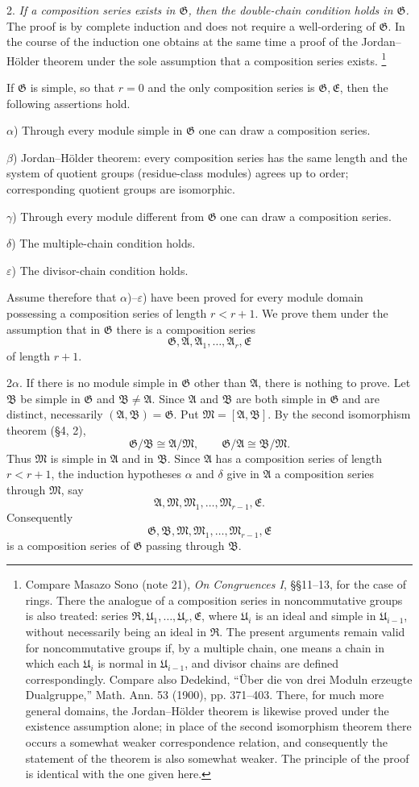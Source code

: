 \documentclass[11pt]{article}
\providecommand{\mR}{\mathfrak{R}}
\providecommand{\mM}{\mathfrak{M}}
\providecommand{\mA}{\mathfrak{A}}
\providecommand{\mB}{\mathfrak{B}}
\providecommand{\mE}{\mathfrak{E}}
\providecommand{\mG}{\mathfrak{G}}
\providecommand{\mU}{\mathfrak{U}}
\begin{document}
2. \emph{If a composition series exists in $\mG$, then the double-chain condition holds in $\mG$.} The proof is by complete induction and does not require a well-ordering of $\mG$. In the course of the induction one obtains at the same time a proof of the Jordan--Hölder theorem under the sole assumption that a composition series exists.
\footnote{Compare Masazo Sono (note 21), \emph{On Congruences I}, §§11--13, for the case of rings. There the analogue of a composition series in noncommutative groups is also treated: series $\mR,\mU_1,\ldots,\mU_r,\mE$, where $\mU_i$ is an ideal and simple in $\mU_{i-1}$, without necessarily being an ideal in $\mR$. The present arguments remain valid for noncommutative groups if, by a multiple chain, one means a chain in which each $\mU_i$ is normal in $\mU_{i-1}$, and divisor chains are defined correspondingly. Compare also Dedekind, ``Über die von drei Moduln erzeugte Dualgruppe,'' Math. Ann. 53 (1900), pp. 371--403. There, for much more general domains, the Jordan--Hölder theorem is likewise proved under the existence assumption alone; in place of the second isomorphism theorem there occurs a somewhat weaker correspondence relation, and consequently the statement of the theorem is also somewhat weaker. The principle of the proof is identical with the one given here.}

If $\mG$ is simple, so that $r=0$ and the only composition series is $\mG,\mE$, then the following assertions hold.

$\alpha$) Through every module simple in $\mG$ one can draw a composition series.

$\beta$) Jordan--Hölder theorem: every composition series has the same length and the system of quotient groups (residue-class modules) agrees up to order; corresponding quotient groups are isomorphic.

$\gamma$) Through every module different from $\mG$ one can draw a composition series.

$\delta$) The multiple-chain condition holds.

$\varepsilon$) The divisor-chain condition holds.

Assume therefore that $\alpha$)--$\varepsilon$) have been proved for every module domain possessing a composition series of length $r<r+1$. We prove them under the assumption that in $\mG$ there is a composition series
\[
        \mG,\mA,\mA_1,\ldots,\mA_r,\mE
\]
of length $r+1$.

2$\alpha$. If there is no module simple in $\mG$ other than $\mA$, there is nothing to prove. Let $\mB$ be simple in $\mG$ and $\mB\ne\mA$. Since $\mA$ and $\mB$ are both simple in $\mG$ and are distinct, necessarily $(\mA,\mB)=\mG$. Put $\mM=[\mA,\mB]$. By the second isomorphism theorem (§4, 2),
\[
        \mG/\mB\cong \mA/\mM,
        \qquad
        \mG/\mA\cong \mB/\mM.
\]
Thus $\mM$ is simple in $\mA$ and in $\mB$. Since $\mA$ has a composition series of length $r<r+1$, the induction hypotheses $\alpha$ and $\delta$ give in $\mA$ a composition series through $\mM$, say
\[
        \mA,\mM,\mM_1,\ldots,\mM_{r-1},\mE.
\]
Consequently
\[
        \mG,\mB,\mM,\mM_1,\ldots,\mM_{r-1},\mE
\]
is a composition series of $\mG$ passing through $\mB$.
\end{document}
